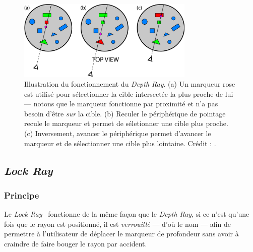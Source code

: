 	\newcommand{\rayWidth}{0.75\textwidth}
	\begin{figure}[!htb]
		\centering
		\includegraphics[width=\rayWidth]{figures/ch2/depthRay}
		\caption[Principe du \emph{Depth Ray}]{Illustration du fonctionnement du \emph{Depth Ray}. (a) Un marqueur rose est utilisé pour sélectionner la cible intersectée la plus proche de lui --- notons que le marqueur fonctionne par proximité et n'a pas besoin d'être \emph{sur} la cible. (b) Reculer le périphérique de pointage recule le marqueur et permet de séletionner une cible plus proche. (c) Inversement, avancer le périphérique permet d'avancer le marqueur et de sélectionner une cible plus lointaine. Crédit : \cite{grossman2006design}.}
		\label{fig:depthRay}
	\end{figure}
	
	\subsection{\emph{Lock Ray}}
	\subsubsection{Principe}
	Le \emph{Lock Ray}~\cite{grossman2006design} fonctionne de la même façon que le \emph{Depth Ray}, si ce n'est qu'une fois que le rayon est positionné, il est \emph{verrouillé} --- d'où le nom --- afin de permettre à l'utilisateur de déplacer le marqueur de profondeur sans avoir à craindre de faire bouger le rayon par accident.
	
